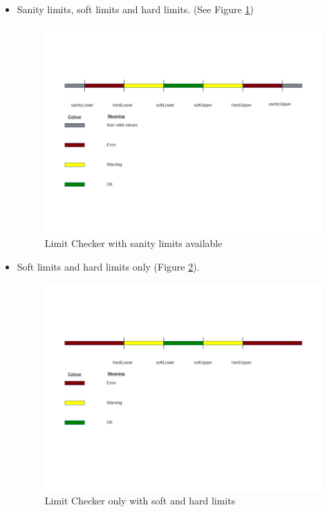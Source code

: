 \begin{itemize}
\item Sanity limits, soft limits and hard limits. (See Figure \ref{f4.2})
\begin{figure}[H]
\centerline{\includegraphics[width=1.2\textwidth]{images/LimitChecking1.png}}
\caption{Limit Checker with sanity limits available}
\label{f4.2}
\end{figure}
\pagebreak
\item Soft limits and hard limits only (Figure \ref{f4.3}).
\begin{figure}[H]
\centerline{\includegraphics[width=1.2\textwidth]{images/LimitChecking2.png}}
\caption{Limit Checker only with soft and hard limits}
\label{f4.3}
\end{figure}
\end{itemize}

